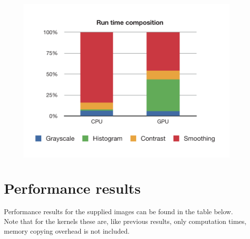 \documentclass[11pt,a4paper]{article}
\begin{document}
\begin{figure}[h]
\includegraphics[scale=0.7]{figures/composition.pdf}
\end{figure}

\section{Performance results}

Performance results for the supplied images can be found in the table below. Note that for the kernels these are, like previous results, only computation times, memory copying overhead is not included. \\
\end{document}
